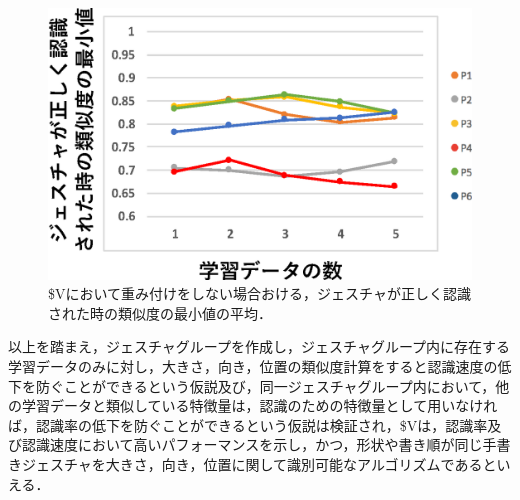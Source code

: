 \begin{figure}[!h]
\centering
\includegraphics[width=0.7\columnwidth]{img/rec_min_10.eps}
\caption{\$Vにおいて重み付けをしない場合おける，ジェスチャが正しく認識された時の類似度の最小値の平均．}
\label{fig:rec_min_10}
\end{figure}

\clearpage
以上を踏まえ，ジェスチャグループを作成し，ジェスチャグループ内に存在する学習データのみに対し，大きさ，向き，位置の類似度計算をすると認識速度の低下を防ぐことができるという仮説及び，同一ジェスチャグループ内において，他の学習データと類似している特徴量は，認識のための特徴量として用いなければ，認識率の低下を防ぐことができるという仮説は検証され，\$Vは，認識率及び認識速度において高いパフォーマンスを示し，かつ，形状や書き順が同じ手書きジェスチャを大きさ，向き，位置に関して識別可能なアルゴリズムであるといえる．

